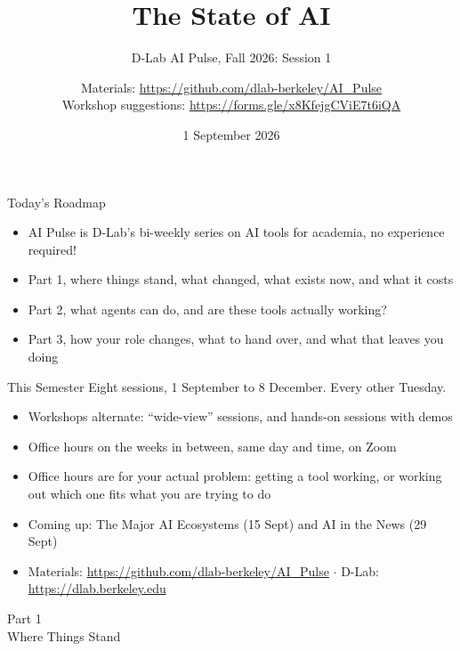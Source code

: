 \documentclass[aspectratio=169]{beamer}
\title{The State of AI}
\subtitle{D-Lab AI Pulse, Fall 2026: Session 1}
\author[D-Lab]{Materials: \url{https://github.com/dlab-berkeley/AI_Pulse}\\Workshop suggestions: \url{https://forms.gle/x8KfejgCViE7t6iQA}}
\date{1 September 2026}
\begin{document}
\begin{frame}
    \titlepage
\end{frame}

\begin{frame}{Today's Roadmap}
    \begin{itemize}\setlength{\itemsep}{7pt}
        \item AI Pulse is D-Lab's bi-weekly series on AI tools for academia, no experience required!
        \item Part 1, where things stand, what changed, what exists now, and what it costs
        \item Part 2, what agents can do, and are these tools actually working?
        \item Part 3, how your role changes, what to hand over, and what that leaves you doing
    \end{itemize}
\end{frame}

\begin{frame}{This Semester}
    Eight sessions, 1 September to 8 December. Every other Tuesday.

    \vspace{1em}
    \begin{itemize}
        \item Workshops alternate: ``wide-view'' sessions, and hands-on sessions with demos
        \item Office hours on the weeks in between, same day and time, on Zoom
        \item Office hours are for your actual problem: getting a tool working, or working out
              which one fits what you are trying to do
        \item Coming up: The Major AI Ecosystems (15 Sept) and AI in the News (29 Sept)
        \item Materials: \url{https://github.com/dlab-berkeley/AI_Pulse} $\cdot$
              D-Lab: \url{https://dlab.berkeley.edu}
    \end{itemize}
\end{frame}


\begin{frame}[plain]
    \vfill
    \begin{center}
        {\Huge Part 1}\\[0.8em]
        {\Large Where Things Stand}
    \end{center}
    \vfill
\end{frame}
\end{document}
